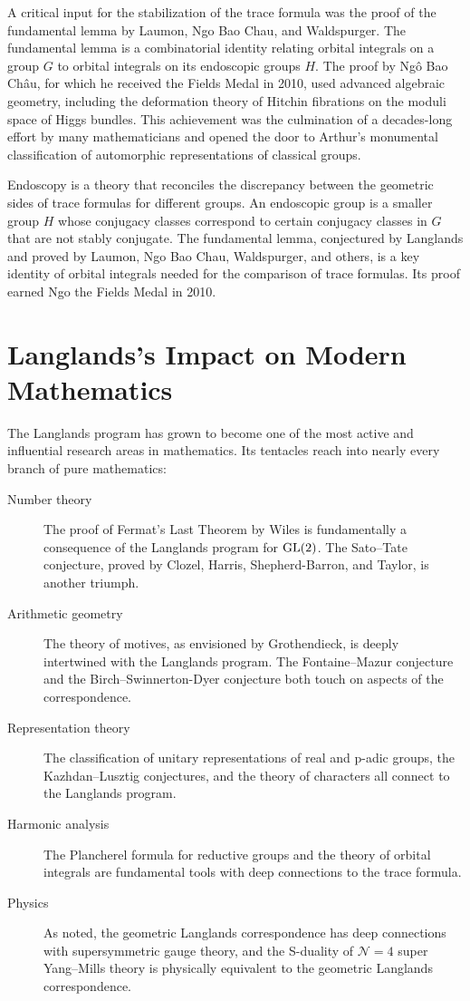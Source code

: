 A critical input for the stabilization of the trace formula was the proof of the fundamental lemma by Laumon, Ngo Bao Chau, and Waldspurger. The fundamental lemma is a combinatorial identity relating orbital integrals on a group \(G\) to orbital integrals on its endoscopic groups \(H\). The proof by Ng\^{o} Bao Ch\^{a}u, for which he received the Fields Medal in 2010, used advanced algebraic geometry, including the deformation theory of Hitchin fibrations on the moduli space of Higgs bundles. This achievement was the culmination of a decades-long effort by many mathematicians and opened the door to Arthur's monumental classification of automorphic representations of classical groups.

Endoscopy is a theory that reconciles the discrepancy between the geometric sides of trace formulas for different groups. An endoscopic group is a smaller group \(H\) whose conjugacy classes correspond to certain conjugacy classes in \(G\) that are not stably conjugate. The fundamental lemma, conjectured by Langlands and proved by Laumon, Ngo Bao Chau, Waldspurger, and others, is a key identity of orbital integrals needed for the comparison of trace formulas. Its proof earned Ngo the Fields Medal in 2010.

\section{Langlands's Impact on Modern Mathematics}

The Langlands program has grown to become one of the most active and influential research areas in mathematics. Its tentacles reach into nearly every branch of pure mathematics:

\begin{description}
\item[Number theory] The proof of Fermat's Last Theorem by Wiles is fundamentally a consequence of the Langlands program for \(\operatorname{GL}(2)\). The Sato--Tate conjecture, proved by Clozel, Harris, Shepherd-Barron, and Taylor, is another triumph.
\item[Arithmetic geometry] The theory of motives, as envisioned by Grothendieck, is deeply intertwined with the Langlands program. The Fontaine--Mazur conjecture and the Birch--Swinnerton-Dyer conjecture both touch on aspects of the correspondence.
\item[Representation theory] The classification of unitary representations of real and p-adic groups, the Kazhdan--Lusztig conjectures, and the theory of characters all connect to the Langlands program.
\item[Harmonic analysis] The Plancherel formula for reductive groups and the theory of orbital integrals are fundamental tools with deep connections to the trace formula.
\item[Physics] As noted, the geometric Langlands correspondence has deep connections with supersymmetric gauge theory, and the S-duality of \(\mathcal{N}=4\) super Yang--Mills theory is physically equivalent to the geometric Langlands correspondence.
\end{description}

